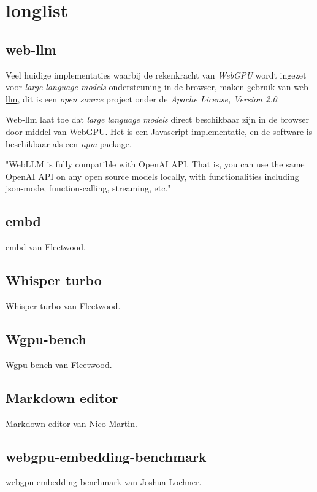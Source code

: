 \chapter{longlist}
\label{ch:longlist}

\section{web-llm}

Veel huidige implementaties waarbij de rekenkracht van \textit{WebGPU} wordt ingezet voor \textit{large language models} ondersteuning in de browser, maken gebruik van \href{https://github.com/mlc-ai/web-llm}{web-llm}, dit is een \textit{open source} project onder de \textit{Apache License, Version 2.0}.

\bigbreak{}

Web-llm laat toe dat \textit{large language models} direct beschikbaar zijn in de browser door middel van WebGPU. Het is een Javascript implementatie, en de software is beschikbaar als een \textit{npm} package.

\begin{displayquote}
    "WebLLM is fully compatible with OpenAI API. That is, you can use the same OpenAI API on any open source models locally, with functionalities including json-mode, function-calling, streaming, etc."
\end{displayquote}

\section{embd}

embd van Fleetwood. \autocite{Fleetwood2023c}

\section{Whisper turbo}

Whisper turbo van Fleetwood. \autocite{Fleetwood2023b}

\section{Wgpu-bench}

Wgpu-bench van Fleetwood. \autocite{Fleetwood2023d}

\section{Markdown editor}

Markdown editor van Nico Martin. \autocite{Martin2020}

\section{webgpu-embedding-benchmark}

webgpu-embedding-benchmark van Joshua Lochner. \autocite{Lochner2024}